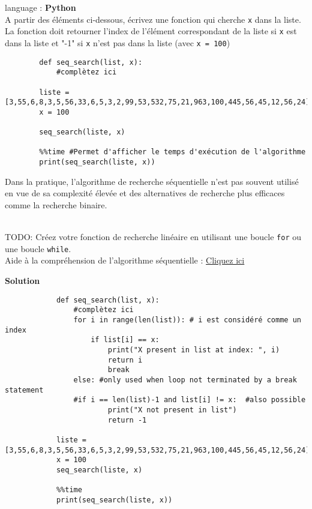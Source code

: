 \begin{Exercice}[5 minutes] language : \textbf{Python}\\

A partir des éléments ci-dessous, écrivez une fonction qui cherche \lstinline{x} dans la liste.\\La fonction doit retourner l'index de l'élément correspondant de la liste si \lstinline{x} est dans la liste et "-1" si \lstinline{x} n'est pas dans la liste (avec \lstinline{x = 100})\\

    \begin{lstlisting}
        def seq_search(list, x):
            #complètez ici
            
        liste = [3,55,6,8,3,5,56,33,6,5,3,2,99,53,532,75,21,963,100,445,56,45,12,56,24]
        x = 100
        
        seq_search(liste, x)
        
        %%time #Permet d'afficher le temps d'exécution de l'algorithme 
        print(seq_search(liste, x))
    \end{lstlisting}

Dans la pratique, l'algorithme de recherche séquentielle n'est pas souvent utilisé en vue de sa complexité élevée et des alternatives de recherche plus efficaces comme la recherche binaire.\\\\

    \begin{conseil}
        TODO: Créez votre fonction de recherche linéaire en utilisant une boucle \lstinline{for} ou une boucle \lstinline{while}.\\
        Aide à la compréhension de l'algorithme séquentielle : \href{https://runestone.academy/runestone/books/published/pythonds/SortSearch/TheSequentialSearch.html\#lst-seqsearchpython}{Cliquez ici}
    \end{conseil}
    
    \begin{solution}
         
    \end{solution}
\textbf{Solution}
    \begin{lstlisting}
            def seq_search(list, x):
                #complètez ici
                for i in range(len(list)): # i est considéré comme un index
                    if list[i] == x:
                        print("X present in list at index: ", i)
                        return i
                        break
                else: #only used when loop not terminated by a break statement
                #if i == len(list)-1 and list[i] != x:  #also possible
                        print("X not present in list")
                        return -1
            
            liste = [3,55,6,8,3,5,56,33,6,5,3,2,99,53,532,75,21,963,100,445,56,45,12,56,24]
            x = 100
            seq_search(liste, x)
            
            %%time 
            print(seq_search(liste, x))
    \end{lstlisting}  
\end{Exercice}

